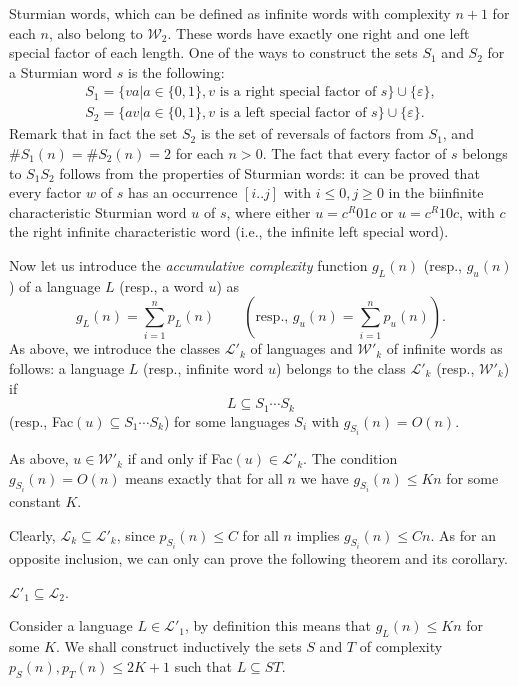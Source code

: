\documentclass[runningheads,envcountsect,envcountsame]{llncs}
\begin{document}
\begin{example} Sturmian words, which can be defined as infinite words with complexity $n+1$ for each $n$, also belong to  $\mathcal W_2$. These words have exactly one right and one left special factor of each length. One of the ways to construct the sets $S_1$ and $S_2$ for a Sturmian word $s$ is the following:
\begin{eqnarray*} S_1=\{va | a\in \{0,1\}, v \mbox{ is a right special factor of } s \} \cup \{\varepsilon\}, \\
S_2=\{av | a\in \{0,1\}, v \mbox{ is a left special factor of } s \} \cup \{\varepsilon\}.
\end{eqnarray*}
Remark that in fact the set $S_2$ is the set of reversals of factors from $S_1$, and $\# S_1 (n)=\# S_2 (n) = 2 $ for each $n>0$.
The fact that every factor of $s$ belongs to $S_1 S_2$ follows from the properties of Sturmian words: it can be proved that every factor $w$ of $s$ has an occurrence $[i..j]$ with $i\leq 0, j\geq 0$ in the biinfinite characteristic Sturmian word $u$ of $s$, where either $u=c^R01c$ or  $u=c^R10c$, with $c$ the right infinite characteristic word (i.e., the infinite left special word). \end{example}

Now let us introduce the {\it accumulative complexity} function $g_L(n)$ (resp., $g_u(n)$) of a language $L$ (resp., a word $u$)
as
\[g_{L}(n)=\sum_{i=1}^{n} p_{L}(n) \qquad (\mbox{resp., } g_{u}(n)=\sum_{i=1}^{n} p_{u}(n)).\]
As above, we introduce the classes $\mathcal L'_k$ of languages
and $\mathcal W'_k$ of infinite words as follows: a language $L$
(resp., infinite word $u$) belongs to the class $\mathcal L'_k$
(resp., $\mathcal W'_{k}$) if
\[L \subseteq S_1\cdots S_k\]
(resp., Fac$(u) \subseteq S_1\cdots S_k$)
for some languages $S_i$ with $g_{S_i}(n)=O(n)$.

As above, $u \in \mathcal W'_k$ if and only if Fac$(u) \in \mathcal L'_k$. The condition $g_{S_i}(n)=O(n)$ means exactly that for all $n$ we have $g_{S_i}(n)\leq Kn$ for some constant $K$.

Clearly, $\mathcal L_k \subseteq \mathcal L'_k$, since $p_{S_i}(n)\leq C$ for all $n$ implies $g_{S_i}(n) \leq Cn$. As for an opposite inclusion, we can only can prove the following theorem and its corollary.

\begin{theorem}
 $\mathcal L'_1 \subseteq \mathcal L_{2}$.
\end{theorem}
 Consider a language $L \in \mathcal L'_1$,
by definition this means  that $g_{L}(n)\leq Kn$ for some $K$. We shall construct inductively the sets $S$ and $T$ of complexity
$p_S(n), p_T(n) \leq 2K+1$ such that $L\subseteq ST$.
\end{document}
